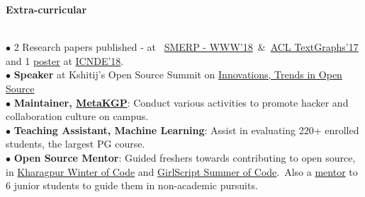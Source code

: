 \documentclass[11pt, a4paper]{resume}
\newcommand{\important}[1]{
	\textcolor{mypurple}{#1}
}
\newcommand{\fillit}[1]{
	\leavevmode\xleaders\hbox{#1}\hfill\kern0pt
}
\newcommand{\sectionTitle}[1]{
	\begin{Large}
    	\important{\textbf{#1}} 
    \end{Large}
    \important{\rlap{\rule[.5ex]{\linegoal}{0.5pt}}{}}
     \vspace{0.1em}\\
}
\begin{document}
\sectionTitle{Extra-curricular}
$\bullet$ 2 Research papers published - at \, \href{https://www.cse.iitk.ac.in/users/kripa/smerp2018/}{SMERP - WWW'18} \,\&\, \href{https://sites.google.com/site/textgraphs2017/program}{ACL TextGraphs'17} and 1 \href{https://drive.google.com/file/d/1fCH2AAAHWp5JLwQxLNGoOYoGnyWrolHf/view?usp=sharing}{poster} at \href{http://cse.iitkgp.ac.in/conf/NSDE/sds/ICNDE2018/pages/selected.html}{ICNDE'18}. \\
$\bullet$ {\bf Speaker} at Kshitij's Open Source Summit on \href{https://www.youtube.com/watch?v=lk4ciY3NSbA}{Innovations, Trends in Open Source}\\
$\bullet$ {\bf Maintainer, \href{http://metakgp.github.io}{MetaKGP}}: Conduct various activities to promote hacker and collaboration culture on campus.\\
$\bullet$ {\bf Teaching Assistant, Machine Learning}: Assist in evaluating 220+ enrolled students, the largest PG course.\\
$\bullet$ {\bf Open Source Mentor}: Guided freshers towards contributing to open source, in \href{https://kwoc.kossiitkgp.in/}{Kharagpur Winter of Code} and \href{https://gssoc.tech/projects.html#facebook-archive}{GirlScript Summer of Code}.\, Also a \href{https://drive.google.com/file/d/0B5iU6cWw36rOc0gzcjZPRTd5SkU/view?usp=sharing}{mentor} to 6 junior students to guide them in non-academic pursuits.
\end{document}
